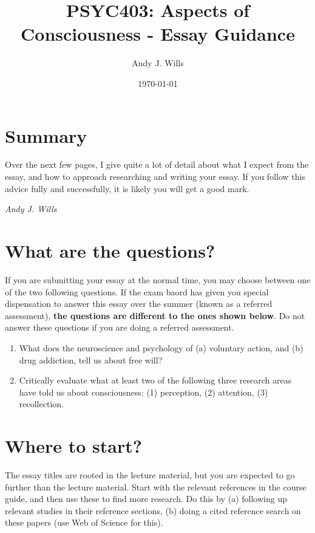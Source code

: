 \documentclass[11pt]{article}
\begin{document}
\title{PSYC403: Aspects of Consciousness - Essay Guidance}

\author{Andy J. Wills}
\date{\today}
\maketitle


\section{Summary}
Over the next few pages, I give quite a lot of detail about what I expect from the essay, and how to approach researching and writing your essay. If you follow this advice fully and successfully, it is likely you will get a good mark.

\begin{flushright}
	\emph{Andy J. Wills}
\end{flushright}

\section{What are the questions?}

If you are submitting your essay at the normal time, you may choose between one of the two following questions. If the exam baord has given you special dispensation to answer this essay over the summer (known as a referred assessment), \textbf{the questions are different to the ones shown below}. Do not answer these questions if you are doing a referred assessment.

\begin{enumerate}

\item What does the neuroscience and psychology of (a) voluntary action, and (b) drug addiction, tell us about free will?

\item Critically evaluate what at least two of the following three research areas have told us about consciousness: (1) perception, (2) attention, (3) recollection. 

\end{enumerate}


\section{Where to start?}

The essay titles are rooted in the lecture material, but you are expected to go further than the lecture material. Start with the relevant references in the course guide, and then use these to find more research. Do this by (a) following up relevant studies in their reference sections, (b) doing a cited reference search on these papers (use Web of Science for this). 
\end{document}
